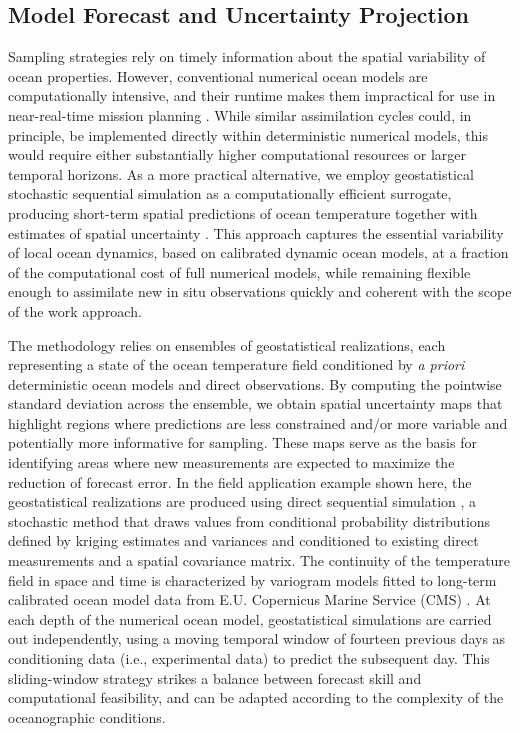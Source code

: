 \subsection{Model Forecast and Uncertainty Projection}

Sampling strategies rely on timely information about the spatial
variability of ocean properties. However, conventional numerical ocean
models are computationally intensive, and their runtime makes them
impractical for use in near-real-time mission planning . While similar assimilation cycles could, in
principle, be implemented directly within deterministic numerical
models, this would require either substantially higher computational
resources or larger temporal horizons. As a more practical
alternative, we employ geostatistical stochastic sequential simulation
as a computationally efficient surrogate, producing short-term spatial
predictions of ocean temperature together with estimates of spatial
uncertainty \cite{deutsch1992}. This approach captures the essential
variability of local ocean dynamics, based on calibrated dynamic ocean
models, at a fraction of the computational cost of full numerical
models, while remaining flexible enough to assimilate new in situ
observations quickly \cite{Duarte2025} and coherent with the scope of
the work approach.

The methodology relies on ensembles of geostatistical realizations,
each representing a state of the ocean temperature field conditioned
by \emph{a priori} deterministic ocean models \cite{CMEMS2017} and
direct observations. By computing the pointwise standard deviation
across the ensemble, we obtain spatial uncertainty maps that highlight
regions where predictions are less constrained and/or more variable
and potentially more informative for sampling. These maps serve as the
basis for identifying areas where new measurements are expected to
maximize the reduction of forecast error. In the field application
example shown here, the geostatistical realizations are produced using
direct sequential simulation \cite{soares2001direct}, a stochastic
method that draws values from conditional probability distributions
defined by kriging estimates and variances and conditioned to existing
direct measurements and a spatial covariance matrix. The continuity of
the temperature field in space and time is characterized by variogram
models fitted to long-term calibrated ocean model data from E.U. Copernicus Marine Service (CMS)
\cite{CMEMS2017}. At each depth of the numerical ocean model,
geostatistical simulations are carried out independently, using a
moving temporal window of fourteen previous   days as conditioning data
(i.e., experimental data) to predict the subsequent day. This
sliding-window strategy strikes a balance between forecast skill and
computational feasibility, and can be adapted according to the
complexity of the oceanographic conditions.

